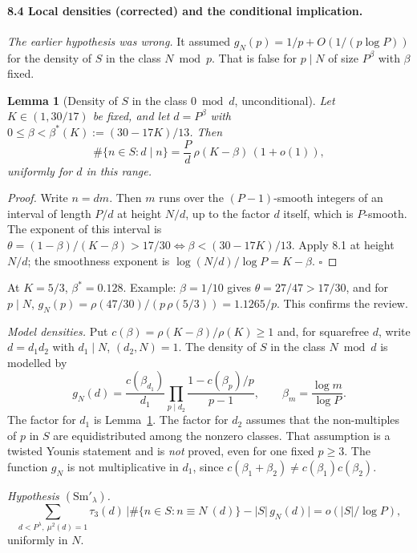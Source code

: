 \documentclass[11pt,a4paper]{article}
\newtheorem{lemma}[proposition]{Lemma}
\theoremstyle{remark}
\begin{document}
\paragraph{8.4 Local densities (corrected) and the conditional implication.}
\emph{The earlier hypothesis was wrong.} It assumed $g_N(p)=1/p+O(1/(p\log P))$ for the density of $S$ in the
class $N\bmod p$. That is false for $p\mid N$ of size $P^{\beta}$ with $\beta$ fixed.

\begin{lemma}[Density of $S$ in the class $0\bmod d$, unconditional]\label{lem:dens0}
Let $K\in(1,30/17)$ be fixed, and let $d=P^{\beta}$ with $0\le\beta<\beta^*(K):=(30-17K)/13$. Then
\[
\#\{n\in S: d\mid n\}=\frac{P}{d}\,\rho(K-\beta)\,(1+o(1)),
\]
uniformly for $d$ in this range.
\end{lemma}
\begin{proof}
Write $n=dm$. Then $m$ runs over the $(P-1)$-smooth integers of an interval of length $P/d$ at height $N/d$, up to
the factor $d$ itself, which is $P$-smooth. The exponent of this interval is
$\theta=(1-\beta)/(K-\beta)>17/30\iff\beta<(30-17K)/13$. Apply 8.1 at height $N/d$; the smoothness exponent is
$\log(N/d)/\log P=K-\beta$. $\square$
\end{proof}
At $K=5/3$, $\beta^*=0.128$. Example: $\beta=1/10$ gives $\theta=27/47>17/30$, and for $p\mid N$,
$g_N(p)=\rho(47/30)/(p\,\rho(5/3))=1.1265/p$. This confirms the review.

\emph{Model densities.} Put $c(\beta)=\rho(K-\beta)/\rho(K)\ge1$ and, for squarefree $d$, write $d=d_1d_2$ with
$d_1\mid N$, $(d_2,N)=1$. The density of $S$ in the class $N\bmod d$ is modelled by
\[
g_N(d)=\frac{c(\beta_{d_1})}{d_1}\prod_{p\mid d_2}\frac{1-c(\beta_p)/p}{p-1},\qquad \beta_m=\frac{\log m}{\log P}.
\]
The factor for $d_1$ is Lemma~\ref{lem:dens0}. The factor for $d_2$ assumes that the non-multiples of $p$ in $S$ are
equidistributed among the nonzero classes. That assumption is a twisted Younis statement and is \emph{not}
proved, even for one fixed $p\ge3$. The function $g_N$ is not multiplicative in $d_1$, since $c(\beta_1+\beta_2)\ne c(\beta_1)c(\beta_2)$.

\emph{Hypothesis $(\mathrm{Sm}'_\lambda)$.}
\[
\sum_{d<P^\lambda,\ \mu^2(d)=1}\tau_3(d)\,\bigl|\#\{n\in S:n\equiv N\ (d)\}-|S|\,g_N(d)\bigr|=o(|S|/\log P),
\]
uniformly in $N$.
\end{document}
